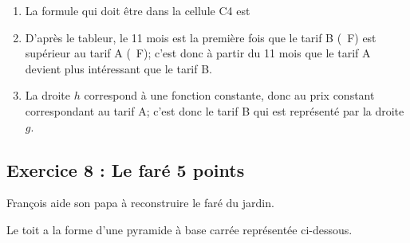 \documentclass[10pt]{article}
\begin{document}
%

\begin{enumerate}
\item La formule qui doit être dans la cellule C4 est

\item D'après le tableur, le 11\ieme{} mois est la première fois que le tarif B (~F) est supérieur au tarif A (~F); c'est donc à partir du 11\ieme{} mois que le tarif A devient plus intéressant que le tarif B. 

\item La droite $h$ correspond à une fonction constante, donc au prix constant correspondant au tarif A; c'est donc le tarif B qui est représenté par la droite $g$.

\end{enumerate}


\vspace{0,5cm}

\subsection*{Exercice 8 : Le faré \hfill 5 points}

\medskip

François aide son papa à reconstruire le faré du jardin.

Le toit a la forme d'une pyramide à base carrée représentée ci-dessous.
\end{document}
